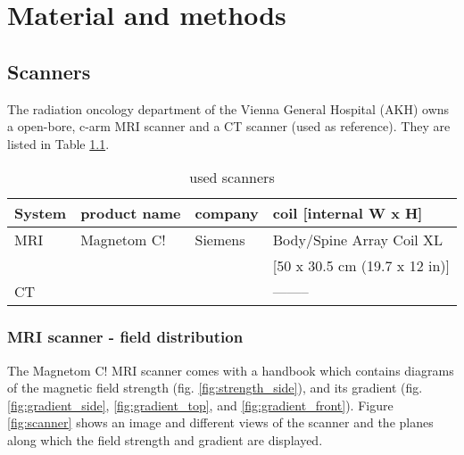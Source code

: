 

\chapter{Material and methods}


\section{Scanners}

The radiation oncology department of the Vienna General Hospital (AKH) owns a open-bore, c-arm MRI scanner and a CT scanner (used as reference).
They are listed in Table \ref{tab:scanners}.

\begin{table}[h]
\centering
\begin{tabular}{llll}
System	& product name	& company	& coil [internal W x H]		\\
\toprule
MRI	& Magnetom C!	& Siemens	& Body/Spine Array Coil XL	\\
	&		&		& [50 x 30.5 cm (19.7 x 12 in)]	\\
CT	&		&		& --------
\end{tabular}
\caption{used scanners}
\label{tab:scanners}
\end{table}

\subsection{MRI scanner - field distribution}
\label{sec:magnetom}

The Magnetom C! MRI scanner comes with a handbook which contains diagrams of the magnetic field strength (fig. \ref{fig:strength_side}), and its gradient (fig. \ref{fig:gradient_side}, \ref{fig:gradient_top}, and  \ref{fig:gradient_front}).
Figure \ref{fig:scanner} shows an image and different views of the scanner and the planes along which the field strength and gradient are displayed.

